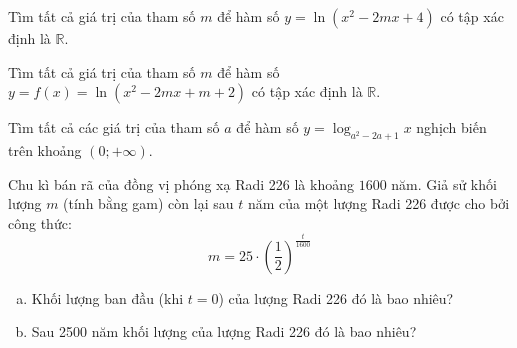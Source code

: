 \begin{baitap}
	Tìm tất cả giá trị của tham số $m$ để hàm số $y=\ln \left(  x^2-2mx+4 \right)$ có tập xác định là $\mathbb{R}$.
\end{baitap} 

\begin{baitap}
	Tìm tất cả giá trị của tham số $m$ để hàm số $y=f(x)=\ln (x^2-2mx+m+2)$ có tập xác định là $\mathbb{R}$.
\end{baitap} 

\begin{baitap}%
	Tìm tất cả các giá trị của tham số $a$ để hàm số $y=\log_{a^2-2a+1}x$ nghịch biến trên khoảng $(0;+\infty)$.
\end{baitap} 

\begin{baitap}%
	Chu kì bán rã của đồng vị phóng xạ Radi 226 là khoảng $1600$ năm. Giả sử khối lượng $m$ (tính bằng gam) còn lại sau $t$ năm của một lượng Radi 226 được cho bởi công thức:
	$$
	m=25 \cdot\left(\frac{1}{2}\right)^{\tfrac{t}{1600}}
	$$
	\begin{enumerate}[a)]
		\item Khối lượng ban đầu (khi $t=0$) của lượng Radi 226 đó là bao nhiêu?
		\item Sau 2500 năm khối lượng của lượng Radi 226 đó là bao nhiêu?
	\end{enumerate}
\end{baitap} 
